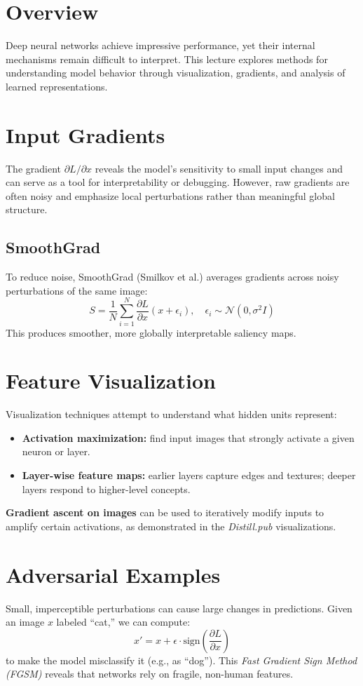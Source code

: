 \documentclass[12pt]{article}
\begin{document}
\psetheader %

\section{Overview}
Deep neural networks achieve impressive performance, yet their internal mechanisms remain difficult to interpret.
This lecture explores methods for understanding model behavior through visualization, gradients, and analysis of learned representations.

\section{Input Gradients}
The gradient $\partial L / \partial x$ reveals the model’s sensitivity to small input changes and can serve as a tool for interpretability or debugging.
However, raw gradients are often noisy and emphasize local perturbations rather than meaningful global structure.

\subsection{SmoothGrad}
To reduce noise, SmoothGrad (Smilkov et al.) averages gradients across noisy perturbations of the same image:
\[
		S = \frac{1}{N}\sum_{i=1}^{N}\frac{\partial L}{\partial x}(x + \epsilon_i), \quad \epsilon_i \sim \mathcal{N}(0, \sigma^2 I)
\]
This produces smoother, more globally interpretable saliency maps.

\section{Feature Visualization}
Visualization techniques attempt to understand what hidden units represent:
\begin{itemize}
		\item \textbf{Activation maximization:} find input images that strongly activate a given neuron or layer.
		\item \textbf{Layer-wise feature maps:} earlier layers capture edges and textures; deeper layers respond to higher-level concepts.
\end{itemize}
\textbf{Gradient ascent on images} can be used to iteratively modify inputs to amplify certain activations, as demonstrated in the \textit{Distill.pub} visualizations.

\section{Adversarial Examples}
Small, imperceptible perturbations can cause large changes in predictions.
Given an image $x$ labeled “cat,” we can compute:
\[
		x' = x + \epsilon \cdot \text{sign}\!\left(\frac{\partial L}{\partial x}\right)
\]
to make the model misclassify it (e.g., as “dog”).
This \textit{Fast Gradient Sign Method (FGSM)} reveals that networks rely on fragile, non-human features.
\end{document}
